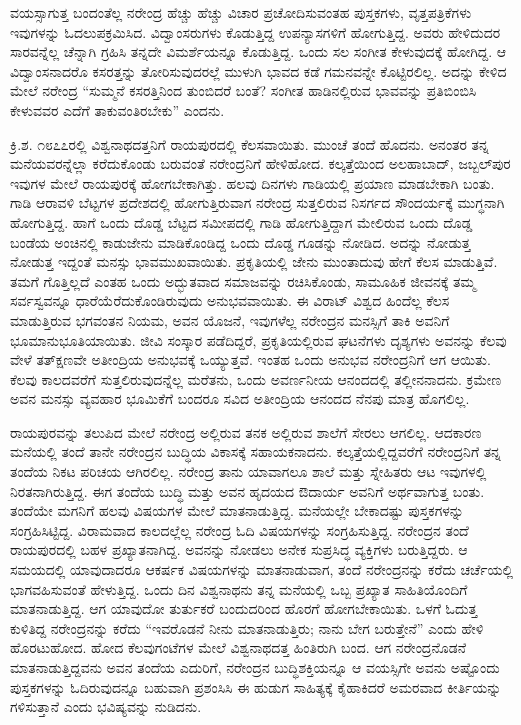 ವಯಸ್ಸಾಗುತ್ತ ಬಂದಂತೆಲ್ಲ ನರೇಂದ್ರ ಹೆಚ್ಚು ಹೆಚ್ಚು ವಿಚಾರ ಪ್ರಚೋದಿಸುವಂತಹ ಪುಸ್ತಕಗಳು, ವೃತ್ತಪತ್ರಿಕೆಗಳು ಇವುಗಳನ್ನು ಓದಲುಪಕ್ರಮಿಸಿದ. ವಿದ್ವಾಂಸರುಗಳು ಕೊಡುತ್ತಿದ್ದ ಉಪನ್ಯಾಸಗಳಿಗೆ ಹೋಗುತ್ತಿದ್ದ. ಅವರು ಹೇಳಿದುದರ ಸಾರವನ್ನೆಲ್ಲ ಚೆನ್ನಾಗಿ ಗ್ರಹಿಸಿ ತನ್ನದೇ ವಿಮರ್ಶೆಯನ್ನೂ ಕೊಡುತ್ತಿದ್ದ. ಒಂದು ಸಲ ಸಂಗೀತ ಕೇಳುವುದಕ್ಕೆ ಹೋಗಿದ್ದ. ಆ ವಿದ್ವಾಂಸನಾದರೊ ಕಸರತ್ತನ್ನು ತೋರಿಸುವುದರಲ್ಲೆ ಮುಳುಗಿ ಭಾವದ ಕಡೆ ಗಮನವನ್ನೇ ಕೊಟ್ಟಿರಲಿಲ್ಲ. ಅದನ್ನು ಕೇಳಿದ ಮೇಲೆ ನರೇಂದ್ರ “ಸುಮ್ಮನೆ ಕಸರತ್ತಿನಿಂದ ತುಂಬಿದರೆ ಬಂತೆ? ಸಂಗೀತ ಹಾಡಿನಲ್ಲಿರುವ ಭಾವವನ್ನು ಪ್ರತಿಬಿಂಬಿಸಿ ಕೇಳುವವರ ಎದೆಗೆ ತಾಕುವಂತಿರಬೇಕು” ಎಂದನು.

ಕ್ರಿ.ಶ. ೧೮೭೭ರಲ್ಲಿ ವಿಶ್ವನಾಥದತ್ತನಿಗೆ ರಾಯಪುರದಲ್ಲಿ ಕೆಲಸವಾಯಿತು. ಮುಂಚೆ ತಂದೆ ಹೊದನು. ಅನಂತರ ತನ್ನ ಮನೆಯವರನ್ನೆಲ್ಲಾ ಕರೆದುಕೊಂಡು ಬರುವಂತೆ ನರೇಂದ್ರನಿಗೆ ಹೇಳಿಹೋದ. ಕಲ್ಕತ್ತೆಯಿಂದ ಅಲಹಾಬಾದ್, ಜಬ್ಬಲ್‍ಪುರ ಇವುಗಳ ಮೇಲೆ ರಾಯಪುರಕ್ಕೆ ಹೋಗಬೇಕಾಗಿತ್ತು. ಹಲವು ದಿನಗಳು ಗಾಡಿಯಲ್ಲಿ ಪ್ರಯಾಣ ಮಾಡಬೇಕಾಗಿ ಬಂತು. ಗಾಡಿ ಆರಾವಳಿ ಬೆಟ್ಟಗಳ ಪ್ರದೇಶದಲ್ಲಿ ಹೋಗುತ್ತಿರುವಾಗ ನರೇಂದ್ರ ಸುತ್ತಲಿರುವ ನಿಸರ್ಗದ ಸೌಂದರ್ಯಕ್ಕೆ ಮುಗ್ಧನಾಗಿ ಹೋಗುತ್ತಿದ್ದ. ಹಾಗೆ ಒಂದು ದೊಡ್ಡ ಬೆಟ್ಟದ ಸಮೀಪದಲ್ಲಿ ಗಾಡಿ ಹೋಗುತ್ತಿದ್ದಾಗ ಮೇಲಿರುವ ಒಂದು ದೊಡ್ಡ ಬಂಡೆಯ ಅಂಚಿನಲ್ಲಿ ಕಾಡುಜೇನು ಮಾಡಿಕೊಂಡಿದ್ದ ಒಂದು ದೊಡ್ಡ ಗೂಡನ್ನು ನೋಡಿದ. ಅದನ್ನು ನೋಡುತ್ತ ನೋಡುತ್ತ ಇದ್ದಂತೆ ಮನಸ್ಸು ಭಾವಮುಖವಾಯಿತು. ಪ್ರಕೃತಿಯಲ್ಲಿ ಜೇನು ಮುಂತಾದುವು ಹೇಗೆ ಕೆಲಸ ಮಾಡುತ್ತಿವೆ. ತಮಗೆ ಗೊತ್ತಿಲ್ಲದೆ ಎಂತಹ ಒಂದು ಅದ್ಭುತವಾದ ಸಮಾಜವನ್ನು ರಚಿಸಿಕೊಂಡು, ಸಾಮೂಹಿಕ ಜೀವನಕ್ಕೆ ತಮ್ಮ ಸರ್ವಸ್ವವನ್ನೂ ಧಾರೆಯೆರೆದುಕೊಂಡಿರುವುದು ಅನುಭವವಾಯಿತು. ಈ ವಿರಾಟ್ ವಿಶ್ವದ ಹಿಂದೆಲ್ಲ ಕೆಲಸ ಮಾಡುತ್ತಿರುವ ಭಗವಂತನ ನಿಯಮ, ಅವನ ಯೊಜನೆ, ಇವುಗಳೆಲ್ಲ ನರೇಂದ್ರನ ಮನಸ್ಸಿಗೆ ತಾಕಿ ಅವನಿಗೆ ಭೂಮಾನುಭೂತಿಯಾಯಿತು. ಜೀವಿ ಸಂಸ್ಕಾರ ಪಡೆದಿದ್ದರೆ, ಪ್ರಕೃತಿಯಲ್ಲಿರುವ ಘಟನೆಗಳು ದೃಶ್ಯಗಳು ಅವನನ್ನು ಕೆಲವು ವೇಳೆ ತತ್‍ಕ್ಷಣವೇ ಅತೀಂದ್ರಿಯ ಅನುಭವಕ್ಕೆ ಒಯ್ಯುತ್ತವೆ. ಇಂತಹ ಒಂದು ಅನುಭವ ನರೇಂದ್ರನಿಗೆ ಆಗ ಆಯಿತು. ಕೆಲವು ಕಾಲದವರೆಗೆ ಸುತ್ತಲಿರುವುದನ್ನೆಲ್ಲ ಮರೆತನು, ಒಂದು ಅವರ್ಣನೀಯ ಆನಂದದಲ್ಲಿ ತಲ್ಲೀನನಾದನು. ಕ್ರಮೇಣ ಅವನ ಮನಸ್ಸು ವ್ಯವಹಾರ ಭೂಮಿಕೆಗೆ ಬಂದರೂ ಸವಿದ ಅತೀಂದ್ರಿಯ ಆನಂದದ ನೆನಪು ಮಾತ್ರ ಹೊಗಲಿಲ್ಲ.

ರಾಯಪುರವನ್ನು ತಲುಪಿದ ಮೇಲೆ ನರೇಂದ್ರ ಅಲ್ಲಿರುವ ತನಕ ಅಲ್ಲಿರುವ ಶಾಲೆಗೆ ಸೇರಲು ಆಗಲಿಲ್ಲ. ಆದಕಾರಣ ಮನೆಯಲ್ಲಿ ತಂದೆ ತಾನೇ ನರೇಂದ್ರನ ಬುದ್ಧಿಯ ವಿಕಾಸಕ್ಕೆ ಸಹಾಯಕನಾದನು. ಕಲ್ಕತ್ತೆಯಲ್ಲಿದ್ದವರೆಗೆ ನರೇಂದ್ರನಿಗೆ ತನ್ನ ತಂದೆಯ ನಿಕಟ ಪರಿಚಯ ಆಗಿರಲಿಲ್ಲ. ನರೇಂದ್ರ ತಾನು ಯಾವಾಗಲೂ ಶಾಲೆ ಮತ್ತು ಸ್ನೇಹಿತರು ಆಟ ಇವುಗಳಲ್ಲಿ ನಿರತನಾಗಿರುತ್ತಿದ್ದ. ಈಗ ತಂದೆಯ ಬುದ್ಧಿ ಮತ್ತು ಅವನ ಹೃದಯದ ಔದಾರ್ಯ ಅವನಿಗೆ ಅರ್ಥವಾಗುತ್ತ ಬಂತು. ತಂದೆಯೇ ಮಗನಿಗೆ ಹಲವು ವಿಷಯಗಳ ಮೇಲೆ ಮಾತನಾಡುತ್ತಿದ್ದ. ಮನೆಯಲ್ಲೇ ಬೇಕಾದಷ್ಟು ಪುಸ್ತಕಗಳನ್ನು ಸಂಗ್ರಹಿಸಿಟ್ಟಿದ್ದ. ವಿರಾಮವಾದ ಕಾಲದಲ್ಲೆಲ್ಲ ನರೇಂದ್ರ ಓದಿ ವಿಷಯಗಳನ್ನು ಸಂಗ್ರಹಿಸುತ್ತಿದ್ದ. ನರೇಂದ್ರನ ತಂದೆ ರಾಯಪುರದಲ್ಲಿ ಬಹಳ ಪ್ರಖ್ಯಾತನಾಗಿದ್ದ. ಅವನನ್ನು ನೋಡಲು ಅನೇಕ ಸುಪ್ರಸಿದ್ಧ ವ್ಯಕ್ತಿಗಳು ಬರುತ್ತಿದ್ದರು. ಆ ಸಮಯದಲ್ಲಿ ಯಾವುದಾದರೂ ಆಕರ್ಷಕ ವಿಷಯಗಳನ್ನು ಮಾತನಾಡುವಾಗ, ತಂದೆ ನರೇಂದ್ರನನ್ನು ಕರೆದು ಚರ್ಚೆಯಲ್ಲಿ ಭಾಗವಹಿಸುವಂತೆ ಹೇಳುತ್ತಿದ್ದ. ಒಂದು ದಿನ ವಿಶ್ವನಾಥನು ತನ್ನ ಮನೆಯಲ್ಲಿ ಒಬ್ಬ ಪ್ರಖ್ಯಾತ ಸಾಹಿತಿಯೊಂದಿಗೆ ಮಾತನಾಡುತ್ತಿದ್ದ. ಆಗ ಯಾವುದೋ ತುರ್ತುಕರೆ ಬಂದುದರಿಂದ ಹೊರಗೆ ಹೋಗಬೇಕಾಯಿತು. ಒಳಗೆ ಓದುತ್ತ ಕುಳಿತಿದ್ದ ನರೇಂದ್ರನನ್ನು ಕರೆದು “ಇವರೊಡನೆ ನೀನು ಮಾತನಾಡುತ್ತಿರು; ನಾನು ಬೇಗ ಬರುತ್ತೇನೆ” ಎಂದು ಹೇಳಿ ಹೊರಟುಹೋದ. ಹೋದ ಕೆಲವುಗಂಟೆಗಳ ಮೇಲೆ ವಿಶ್ವನಾಥದತ್ತ ಹಿಂತಿರುಗಿ ಬಂದ. ಆಗ ನರೇಂದ್ರನೊಡನೆ ಮಾತನಾಡುತ್ತಿದ್ದವನು ಅವನ ತಂದೆಯ ಎದುರಿಗೆ, ನರೇಂದ್ರನ ಬುದ್ಧಿಶಕ್ತಿಯನ್ನೂ ಆ ವಯಸ್ಸಿಗೇ ಅವನು ಅಷ್ಟೊಂದು ಪುಸ್ತಕಗಳನ್ನು ಓದಿರುವುದನ್ನೂ ಬಹುವಾಗಿ ಪ್ರಶಂಸಿಸಿ ಈ ಹುಡುಗ ಸಾಹಿತ್ಯಕ್ಕೆ ಕೈಹಾಕಿದರೆ ಅಮರವಾದ ಕೀರ್ತಿಯನ್ನು ಗಳಿಸುತ್ತಾನೆ ಎಂದು ಭವಿಷ್ಯವನ್ನು ನುಡಿದನು.

